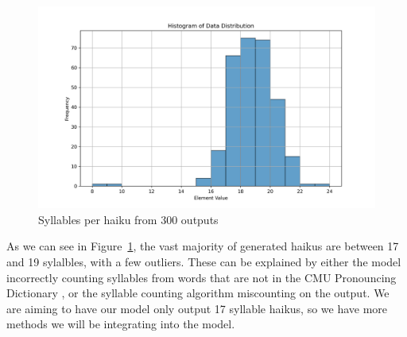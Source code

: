 \documentclass{article} %
\begin{document}
\begin{figure}[h]
\begin{center}
\includegraphics[width=1\textwidth]{Figs/plot.png}
\end{center}
\caption{Syllables per haiku from 300 outputs}
\label{fig:plot}
\end{figure}

As we can see in Figure~\ref{fig:plot}, the vast majority of generated haikus are between 17 and 19 sylalbles, with a few outliers.
These can be explained by either the model incorrectly counting syllables from words that are not
in the CMU Pronouncing Dictionary \citep{cmu_pronouncing_dictionary}, or the syllable counting algorithm
miscounting on the output.
We are aiming to have our model only output 17 syllable haikus, so we have more methods we will be integrating into the model.
\end{document}
